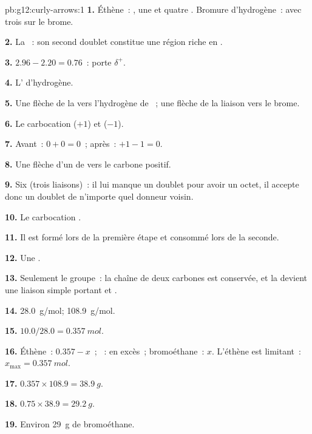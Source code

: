 \begin{solution}{pb:g12:curly-arrows:1}
\textbf{1.} Éthène~: , une  et quatre
. Bromure d'hydrogène~:  avec trois 
sur le brome.

\textbf{2.} La ~: son second doublet constitue une région
riche en .

\textbf{3.} $2.96 - 2.20 = 0.76$~:  porte $\delta^+$.

\textbf{4.} L' d'hydrogène.

\textbf{5.} Une flèche de la  vers l'hydrogène de
~; une flèche de la liaison  vers le brome.

\textbf{6.} Le carbocation  ($+1$) et  ($-1$).

\textbf{7.} Avant~: $0 + 0 = 0$~; après~: $+1 - 1 = 0$.

\textbf{8.} Une flèche d'un  de  vers le
carbone positif.

\textbf{9.} Six (trois liaisons)~: il lui manque un doublet pour avoir
un octet, il accepte donc un doublet de n'importe quel donneur voisin.

\textbf{10.} Le carbocation .

\textbf{11.} Il est formé lors de la première étape et consommé lors de
la seconde.

\textbf{12.} Une .

\textbf{13.} Seulement le groupe~: la chaîne de deux carbones est
conservée, et la  devient une liaison simple portant
 et .

\textbf{14.} \qty{28.0}{g/mol}; \qty{108.9}{g/mol}.

\textbf{15.} $10.0 / 28.0 = \qty{0.357}{mol}$.

\textbf{16.} Éthène~: $0.357 - x$~; ~: en excès~; bromoéthane~:
$x$. L'éthène est limitant~: $x_{\max} = \qty{0.357}{mol}$.

\textbf{17.} $0.357 \times 108.9 = \qty{38.9}{g}$.

\textbf{18.} $0.75 \times 38.9 = \qty{29.2}{g}$.

\textbf{19.} Environ \qty{29}{g} de bromoéthane.
\end{solution}
